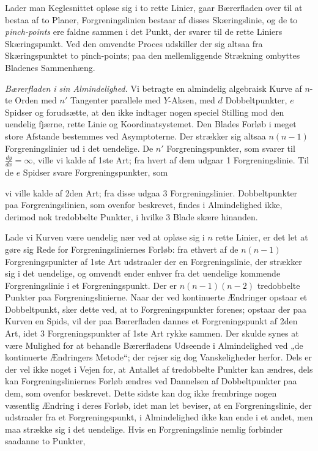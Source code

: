 \documentclass{article}
\begin{document}
Lader man Keglesnittet opløse sig i to rette Linier, gaar Bærerfladen over til at bestaa af to Planer, Forgreningslinien bestaar af disses Skæringslinie, og de to \emph{pinch-points} ere faldne sammen i det Punkt, der svarer til de rette Liniers Skæringspunkt. Ved den omvendte Proces udskiller der sig altsaa fra Skæringspunktet to pinch-points; paa den mellemliggende Strækning ombyttes Bladenes Sammenhæng.

\emph{Bærerfladen i sin Almindelighed.} Vi betragte en almindelig algebraisk Kurve af $n$-te Orden med $n'$ Tangenter parallele med $Y$-Aksen, med $d$ Dobbeltpunkter, $e$ Spidser og forudsætte, at den ikke indtager nogen speciel Stilling mod den uendelig fjærne, rette Linie og Koordinatsystemet. Den Blades Forløb i meget store Afstande bestemmes ved Asymptoterne. Der strækker sig altsaa $n(n - 1)$ Forgreningslinier ud i det uendelige. De $n'$ Forgreningspunkter, som svarer til $\frac{dy}{dx} = \infty$, ville vi kalde af 1ste Art; fra hvert af dem udgaar 1 Forgreningslinie. Til de $e$ Spidser svare Forgreningspunkter, som

vi ville kalde af 2den Art; fra disse udgaa 3 Forgreningslinier. Dobbeltpunkter paa Forgreningslinien, som ovenfor beskrevet, findes i Almindelighed ikke, derimod nok tredobbelte Punkter, i hvilke 3 Blade skære hinanden.

Lade vi Kurven være uendelig nær ved at opløse sig i $n$ rette Linier, er det let at gøre sig Rede for Forgreningsliniernes Forløb: fra ethvert af de $n(n - 1)$ Forgreningspunkter af 1ste Art udstraaler der en Forgreningslinie, der strækker sig i det uendelige, og omvendt ender enhver fra det uendelige kommende Forgreningslinie i et Forgreningspunkt. Der er $n(n - 1)(n - 2)$ tredobbelte Punkter paa Forgreningslinierne. Naar der ved kontinuerte Ændringer opstaar et Dobbeltpunkt, sker dette ved, at to Forgreningspunkter forenes; opstaar der paa Kurven en Spids, vil der paa Bærerfladen dannes et Forgreningspunkt af 2den Art, idet 3 Forgreningspunkter af 1ste Art rykke sammen. Der skulde synes at være Mulighed for at behandle Bærerfladens Udseende i Almindelighed ved „de kontinuerte Ændringers Metode“; der rejser sig dog Vanskeligheder herfor. Dels er der vel ikke noget i Vejen for, at Antallet af tredobbelte Punkter kan ændres, dels kan Forgreningsliniernes Forløb ændres ved Dannelsen af Dobbeltpunkter paa dem, som ovenfor beskrevet. Dette sidste kan dog ikke frembringe nogen væsentlig Ændring i deres Forløb, idet man let beviser, at en Forgreningslinie, der udstraaler fra et Forgreningspunkt, i Almindelighed ikke kan ende i et andet, men maa strække sig i det uendelige. Hvis en Forgreningslinie nemlig forbinder saadanne to Punkter,
\end{document}
